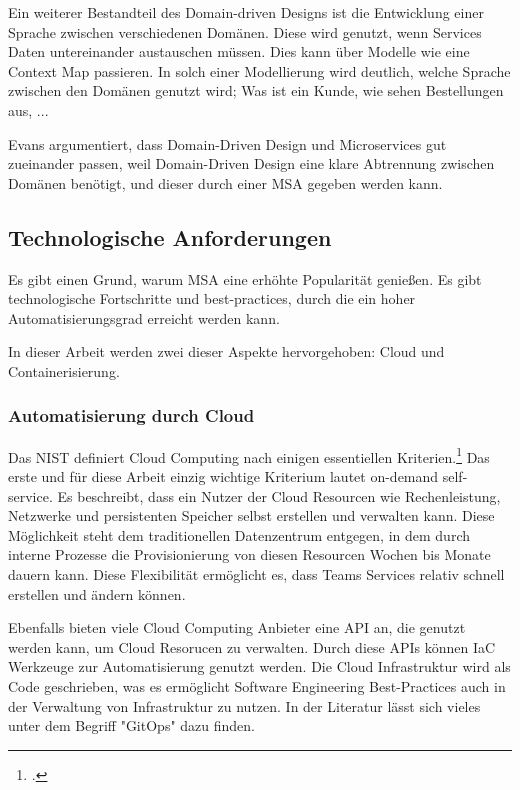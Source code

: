 Ein weiterer Bestandteil des Domain-driven Designs ist die Entwicklung einer
Sprache zwischen verschiedenen Domänen. Diese wird genutzt, wenn Services Daten
untereinander austauschen müssen. Dies kann über Modelle wie eine Context Map
passieren. In solch einer Modellierung wird deutlich, welche Sprache zwischen
den Domänen genutzt wird; Was ist ein Kunde, wie sehen Bestellungen aus, ...

Evans argumentiert, dass Domain-Driven Design und Microservices gut zueinander
passen, weil Domain-Driven Design eine klare Abtrennung zwischen Domänen
benötigt, und dieser durch einer MSA gegeben werden kann.



\subsection{Technologische Anforderungen}

Es gibt einen Grund, warum MSA eine erhöhte Popularität genießen. Es gibt
technologische Fortschritte und best-practices, durch die ein hoher
Automatisierungsgrad erreicht werden kann.

In dieser Arbeit werden zwei dieser Aspekte hervorgehoben: Cloud und
Containerisierung.

\subsubsection{Automatisierung durch Cloud}

Das NIST definiert Cloud Computing nach einigen essentiellen
Kriterien.\footcite{nistcloudcomputing} Das erste und für diese Arbeit einzig
wichtige Kriterium lautet on-demand self-service. Es beschreibt, dass ein Nutzer
der Cloud Resourcen wie Rechenleistung, Netzwerke und persistenten Speicher
selbst erstellen und verwalten kann. Diese Möglichkeit steht dem traditionellen
Datenzentrum entgegen, in dem durch interne Prozesse die Provisionierung von
diesen Resourcen Wochen bis Monate dauern kann. Diese Flexibilität ermöglicht
es, dass Teams Services relativ schnell erstellen und ändern können.

Ebenfalls bieten viele Cloud Computing Anbieter eine API an, die genutzt werden
kann, um Cloud Resorucen zu verwalten. Durch diese APIs können \ac{IaC}
Werkzeuge zur Automatisierung genutzt werden. Die Cloud Infrastruktur wird als
Code geschrieben, was es ermöglicht Software Engineering Best-Practices auch in
der Verwaltung von Infrastruktur zu nutzen. In der Literatur lässt sich vieles
unter dem Begriff "GitOps" dazu finden.


